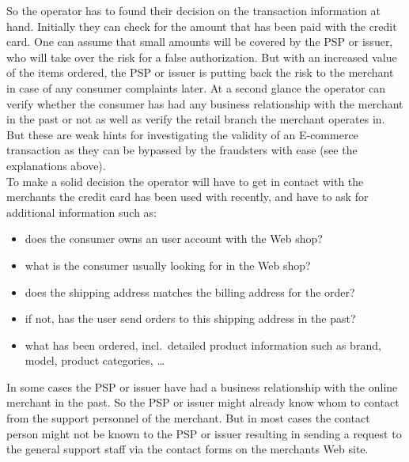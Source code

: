 So the operator has to found their decision on the transaction information at hand. Initially they can check for the amount that has been paid with the credit card. One can assume that small amounts will be covered by the \gls{PSP} or issuer, who will take over the risk for a false authorization. But with an increased value of the items ordered, the \gls{PSP} or issuer is putting back the risk to the merchant in case of any consumer complaints later. At a second glance the operator can verify whether the consumer has had any business relationship with the merchant in the past or not as well as verify the retail branch the merchant operates in. But these are weak hints for investigating the validity of an \gls{E-commerce} transaction as they can be bypassed by the fraudsters with ease (see the explanations above). \\

To make a solid decision the operator will have to get in contact with the merchants the credit card has been used with recently, and have to ask for additional information such as:\@

\begin{itemize}
  \item does the consumer owns an user account with the Web shop?
  \item what is the consumer usually looking for in the Web shop?
  \item does the shipping address matches the billing address for the order?
  \item if not, has the user send orders to this shipping address in the past?
  \item what has been ordered, incl.\ detailed product information such as brand, model, product categories, \ldots
\end{itemize}

In some cases the \gls{PSP} or issuer have had a business relationship with the online merchant in the past. So the \gls{PSP} or issuer might already know whom to contact from the support personnel of the merchant. But in most cases the contact person might not be known to the \gls{PSP} or issuer resulting in sending a request to the general support staff via the contact forms on the merchants Web site. \\

